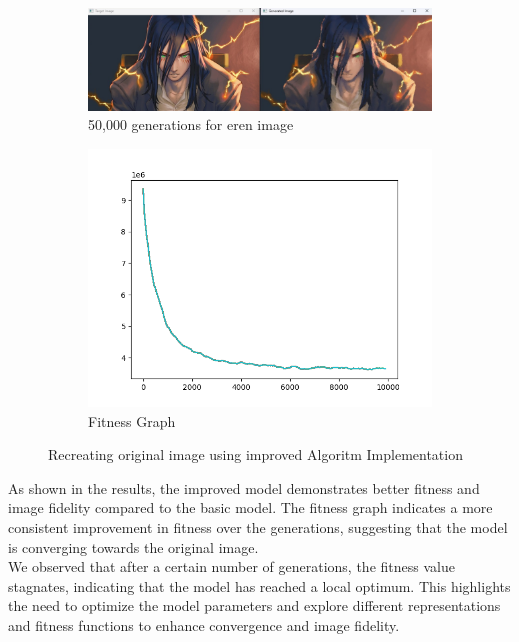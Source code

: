 \documentclass[10pt, conference]{IEEEtran}
\begin{document}
\begin{figure}[h!]
\begin{subfigure}{0.4\linewidth}
	\end{subfigure}
	\begin{subfigure}{0.8\linewidth}
		\centering
		\includegraphics[width=\linewidth]{Screenshot 2025-01-02 173147.png}
		\caption{50,000 generations for eren image}
	\end{subfigure}
	\begin{subfigure}{0.8\linewidth}
		\centering
		\includegraphics[width=\linewidth]{fitness_generation_9900.png}
		\caption{Fitness Graph}
	\end{subfigure}
	\caption{Recreating original image using improved Algoritm Implementation}
\end{figure}

As shown in the results, the improved model demonstrates better fitness and image fidelity compared to the basic model. The fitness graph indicates a more consistent improvement in fitness over the generations, suggesting that the model is converging towards the original image.\\
We observed that after a certain number of generations, the fitness value stagnates, indicating that the model has reached a local optimum. This highlights the need to optimize the model parameters and explore different representations and fitness functions to enhance convergence and image fidelity.
\end{document}
